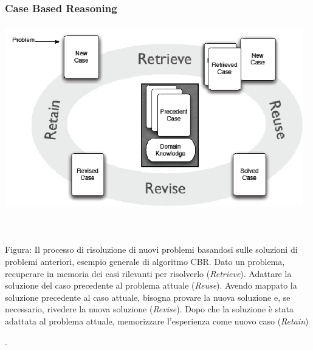 \documentclass[a4paper,12pt]{report}
\begin{document}
\subsubsection{Case Based Reasoning}
\begin{fig}
	\begin{center}
		\includegraphics[width=13cm,height=8cm]{cbr}
	\end{center}

	\caption{\\~\\ Figura: Il processo di risoluzione di nuovi problemi basandosi sulle soluzioni di problemi anteriori, esempio generale di algoritmo CBR. Dato un problema, recuperare in memoria dei casi rilevanti per risolverlo (\textit{Retrieve}). Adattare la soluzione del caso precedente al problema attuale (\textit{Reuse}). Avendo mappato la soluzione precedente al caso attuale, bisogna provare la nuova soluzione e, se necessario, rivedere la nuova soluzione (\textit{Revise}). Dopo che la soluzione è stata adattata al problema attuale, memorizzare l'esperienza come nuovo caso (\textit{Retain})}.
\end{fig}
\end{document}
